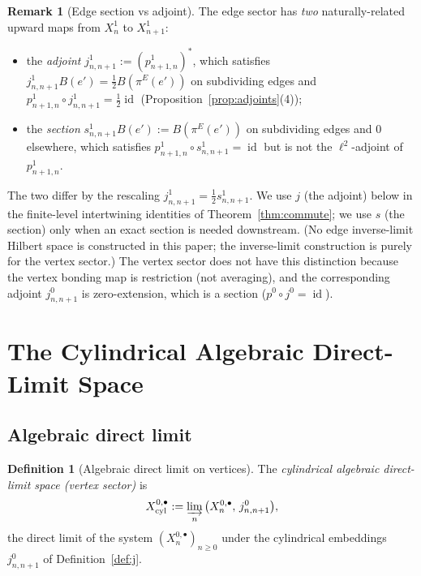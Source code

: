 \documentclass[11pt, a4paper]{amsart}
\theoremstyle{definition}
\newtheorem{definition}[theorem]{Definition}
\newtheorem{remark}[theorem]{Remark}
\newcommand{\id}{\operatorname{id}}
\newcommand{\cyl}{\mathrm{cyl}}
\begin{document}
\begin{remark}[Edge section vs adjoint]
\label{rmk:edge-section}
The edge sector has \emph{two} naturally-related upward maps from
$X_n^1$ to $X_{n+1}^1$:
\begin{itemize}
\item the \emph{adjoint} $j_{n, n+1}^1 := (p_{n+1, n}^1)^*$, which
  satisfies $j_{n, n+1}^1 B(e') = \tfrac{1}{2} B(\pi^E(e'))$ on
  subdividing edges and $p_{n+1, n}^1 \circ j_{n, n+1}^1 =
  \tfrac{1}{2} \id$ (Proposition~\ref{prop:adjoints}(4));
\item the \emph{section} $s_{n, n+1}^1 B(e') := B(\pi^E(e'))$
  on subdividing edges and $0$ elsewhere, which satisfies
  $p_{n+1, n}^1 \circ s_{n, n+1}^1 = \id$ but is not the
  $\ell^2$-adjoint of $p_{n+1, n}^1$.
\end{itemize}
The two differ by the rescaling $j_{n, n+1}^1 = \tfrac{1}{2}
s_{n, n+1}^1$. We use $j$ (the adjoint) below in the
finite-level intertwining identities of
Theorem~\ref{thm:commute}; we use $s$ (the section) only when an
exact section is needed downstream. (No edge inverse-limit
Hilbert space is constructed in this paper; the inverse-limit
construction is purely for the vertex sector.) The vertex sector
does not have this
distinction because the vertex bonding map is restriction (not
averaging), and the corresponding adjoint $j_{n, n+1}^0$ is
zero-extension, which is a section ($p^0 \circ j^0 = \id$).
\end{remark}

\section{The Cylindrical Algebraic Direct-Limit Space}
\label{sec:cyl-lim}

\subsection{Algebraic direct limit}

\begin{definition}[Algebraic direct limit on vertices]
\label{def:Xcyl-vertex}
The \emph{cylindrical algebraic direct-limit space (vertex sector)}
is
\[
  X_\cyl^{0, \bullet} := \varinjlim_n \big( X_n^{0, \bullet},\,
    j_{n, n+1}^0 \big),
\]
the direct limit of the system $(X_n^{0, \bullet})_{n \geq 0}$
under the cylindrical embeddings $j_{n, n+1}^0$ of
Definition~\ref{def:j}.
\end{definition}
\end{document}
